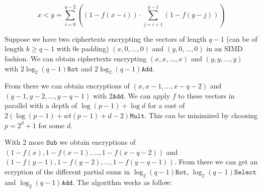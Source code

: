 \documentclass[a4paper,11pt]{article}
\theoremstyle{definition}
\begin{document}
$$ x < y = \sum_{i=0}^{q-2} \left( (1-f(x-i)) \cdot \sum_{j=i+1}^{q-1} (1 - f(y-j)) \right) $$

Suppose we have two ciphertexts encrypting the vectors of length $q-1$ (can be of length $k\geq q-1$ with $0$s padding) $(x,0,\ldots,0)$ and $(y,0,\ldots,0)$ in an SIMD fashion. We can obtain ciphertexts encrypting $(x,x,\ldots, x)$ and $(y,y,\ldots, y)$ with $2\log_2(q-1)\texttt{Rot}$ and $2\log_2(q-1)\texttt{Add}$. 

From there we can obtain encryptions of $(x,x-1,\ldots, x-q-2)$ and $(y-1,y-2,\ldots, y-q-1)$ with $2\texttt{Add}$. We can apply $f$ to these vectors in parallel with a depth of $\log (p-1) + \log d$ for a cost of $2(\log (p-1) + wt(p-1) + d - 2) \texttt{Mult}$. This can be minimized by choosing $p = 2^d + 1$ for some $d$.

With $2$ more $\texttt{Sub}$ we obtain encryptions of $(1-f(x), 1-f(x-1), \ldots, 1-f(x-q-2))$ and $(1-f(y-1), 1-f(y-2), \ldots, 1-f(y-q-1))$. From there we can get an ecryption of the different partial sums in $\log_2(q-1)\texttt{Rot}$, $\log_2(q-1)\texttt{Select}$ and $\log_2(q-1)\texttt{Add}$. The algorithm works as follow:
\end{document}
